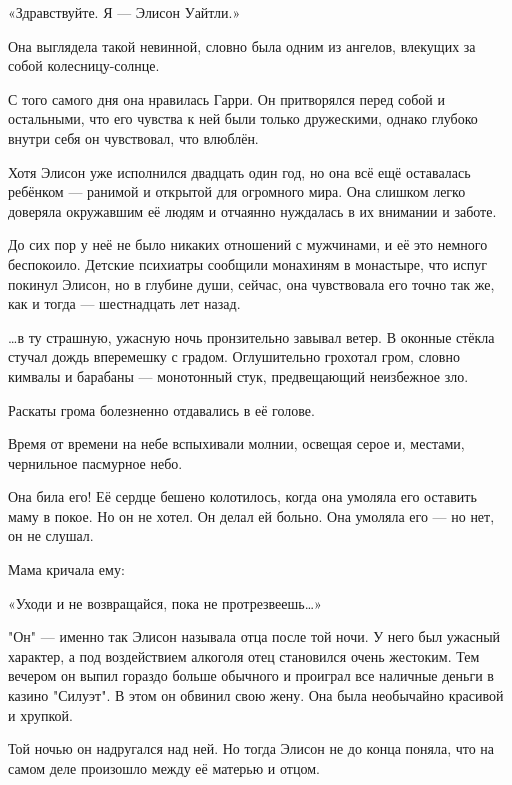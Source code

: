 \documentclass[a4paper,12pt]{book}
\begin{document}
\par
«Здравствуйте. Я — Элисон Уайтли.»\\
\par
Она выглядела такой невинной, словно была одним из ангелов, влекущих за собой колесницу-солнце.
\par
С того самого дня она нравилась Гарри. Он притворялся перед собой и остальными, что его чувства к ней были только дружескими, однако глубоко внутри себя он чувствовал, что влюблён.\\
\par
Хотя Элисон уже исполнился двадцать один год, но она всё ещё оставалась ребёнком — ранимой и открытой для огромного мира. Она слишком легко доверяла окружавшим её людям и отчаянно нуждалась в их внимании и заботе.
\par
До сих пор у неё не было никаких отношений с мужчинами, и её это немного беспокоило. Детские психиатры сообщили монахиням в монастыре, что испуг покинул Элисон, но в глубине души, сейчас, она чувствовала его точно так же, как и тогда — шестнадцать лет назад.\\
\par
…в ту страшную, ужасную ночь пронзительно завывал ветер. В оконные стёкла стучал дождь вперемешку с градом. Оглушительно грохотал гром, словно кимвалы и барабаны — монотонный стук, предвещающий неизбежное зло.\\
\par
Раскаты грома болезненно  отдавались в её голове.\\
\par
Время от времени на небе вспыхивали молнии, освещая серое и, местами, чернильное пасмурное небо.
\par
Она била его! Её сердце бешено колотилось, когда она умоляла его оставить маму в покое. Но он не хотел. Он делал ей больно. Она умоляла его — но нет, он не слушал.
\par
Мама кричала ему:
\par
«Уходи и не возвращайся, пока не протрезвеешь…»\\
\par
"Он" — именно так Элисон называла отца после той ночи. У него был ужасный характер, а под воздействием алкоголя отец становился очень жестоким. Тем вечером он выпил гораздо больше обычного и проиграл все наличные деньги в казино "Силуэт". В этом он обвинил свою жену. Она была необычайно красивой и хрупкой.
\par
Той ночью он надругался над ней. Но тогда Элисон не до конца поняла, что на самом деле произошло между её матерью и отцом.
\end{document}
